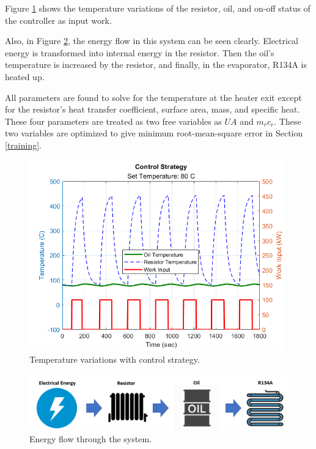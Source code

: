 \par
Figure \ref{fig:control} shows the temperature variations of the resistor, oil, and on-off status of the controller as input work. 

\par
Also, in Figure \ref{fig:energyflow}, the energy flow in this system can be seen clearly. Electrical energy is transformed into internal energy in the resistor. Then the oil's temperature is increased by the resistor, and finally, in the evaporator, R134A is heated up.


All parameters are found to solve for the temperature at the heater exit except for the resistor's heat transfer coefficient, surface area, mass, and specific heat. These four parameters are treated as two free variables as $UA$ and $m_{r}c_{r}$. These two variables are optimized to give minimum root-mean-square error in Section \ref{training}.

\begin{figure}[H]
    \centering
    \includegraphics[width=11cm]{images/control_strategy.png}
    \caption{Temperature variations with control strategy.}
    \label{fig:control}
\end{figure}

\begin{figure}[H]
    \centering
    \includegraphics[width=14cm]{images/energyflow.png}
    \caption{Energy flow through the system.}
    \label{fig:energyflow}
\end{figure}

